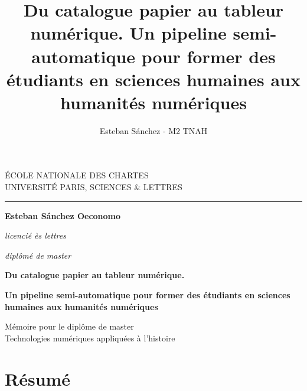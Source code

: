 \documentclass[a4paper,12pt,twoside]{book}
\author{Esteban Sánchez - M2 TNAH}
\title{Du catalogue papier au tableur numérique. Un pipeline semi-automatique pour former des étudiants en sciences humaines aux humanités numériques}
\begin{document}
	

	\begin{titlepage}
	\begin{center}
		
		\bigskip
		
		\begin{large}				
			ÉCOLE NATIONALE DES CHARTES\\
			UNIVERSITÉ PARIS, SCIENCES \& LETTRES
		\end{large}
		\begin{center}\rule{2cm}{0.02cm}\end{center}
		
		\bigskip
		\bigskip
		\bigskip
		\begin{Large}
			\textbf{Esteban Sánchez Oeconomo}\\
		\end{Large}
		\begin{normalsize} 
			\textit{licencié ès lettres}
			
			\textit{diplômé de master}
		\end{normalsize}
		
		\bigskip
		\bigskip
		\bigskip
		
		\begin{Huge}
			\textbf{Du catalogue papier au tableur numérique.}\\
		\end{Huge}
		\bigskip
		\bigskip
		\begin{LARGE}
			\textbf{Un pipeline semi-automatique pour former des étudiants en sciences humaines aux humanités numériques}\\
		\end{LARGE}
		
		\bigskip
		\bigskip
		\bigskip
		\begin{large}
		\end{large}
		\vfill
		
		\begin{large}
			Mémoire 
			pour le diplôme de master \\
			\og{} Technologies numériques appliquées à l'histoire \fg{} \\
		\end{large}
		
	\end{center}
\end{titlepage}

\thispagestyle{empty}	
\cleardoublepage

\frontmatter
\chapter{Résumé}
\end{document}
